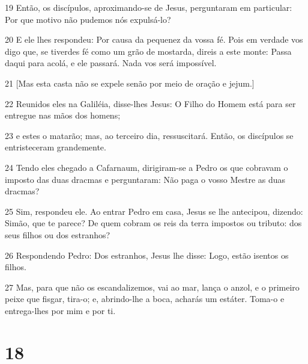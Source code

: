 \par 19 Então, os discípulos, aproximando-se de Jesus, perguntaram em particular: Por que motivo não pudemos nós expulsá-lo?
\par 20 E ele lhes respondeu: Por causa da pequenez da vossa fé. Pois em verdade vos digo que, se tiverdes fé como um grão de mostarda, direis a este monte: Passa daqui para acolá, e ele passará. Nada vos será impossível.
\par 21 [Mas esta casta não se expele senão por meio de oração e jejum.]
\par 22 Reunidos eles na Galiléia, disse-lhes Jesus: O Filho do Homem está para ser entregue nas mãos dos homens;
\par 23 e estes o matarão; mas, ao terceiro dia, ressuscitará. Então, os discípulos se entristeceram grandemente.
\par 24 Tendo eles chegado a Cafarnaum, dirigiram-se a Pedro os que cobravam o imposto das duas dracmas e perguntaram: Não paga o vosso Mestre as duas dracmas?
\par 25 Sim, respondeu ele. Ao entrar Pedro em casa, Jesus se lhe antecipou, dizendo: Simão, que te parece? De quem cobram os reis da terra impostos ou tributo: dos seus filhos ou dos estranhos?
\par 26 Respondendo Pedro: Dos estranhos, Jesus lhe disse: Logo, estão isentos os filhos.
\par 27 Mas, para que não os escandalizemos, vai ao mar, lança o anzol, e o primeiro peixe que fisgar, tira-o; e, abrindo-lhe a boca, acharás um estáter. Toma-o e entrega-lhes por mim e por ti.

\chapter{18}

